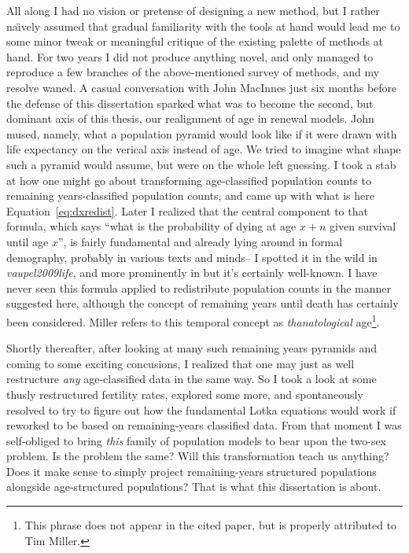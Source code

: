 All along I had no vision or pretense of designing a new method, but I rather
na\"{\i}vely assumed that gradual familiarity with the tools at hand would lead
me to some minor tweak or meaningful critique of the existing palette of methods at
hand. For two years I did not produce anything novel, and only managed to
reproduce a few branches of the above-mentioned survey of methods, and my
resolve waned. A casual conversation with John MacInnes just six months before
the defense of this dissertation sparked what was to become the second, but
dominant axis of this thesis, our realignment of age in renewal models. John
mused, namely, what a population pyramid would look like if it were drawn with
life expectancy on the verical axis instead of age. We tried to imagine what
shape such a pyramid would assume, but were on the whole left guessing. I took a
stab at how one might go about transforming age-classified population counts to
remaining years-classified population counts, and came up with what is here
Equation~\ref{eq:dxredist}. Later I realized that the central component to that
formula, which says ``what is the probability of dying at age $x+n$ given
survival until age $x$'', is fairly fundamental and already lying around in
formal demography, probably in various texts and minds-- I spotted it in the
wild in \textit{vaupel2009life}, and more prominently in
\citet{miller2001increasing} but it's certainly well-known. I have never seen 
this formula applied to redistribute population counts in the manner
suggested here, although the concept of remaining years until death has
certainly been considered. Miller refers to this
temporal concept as \textit{thanatological} age\footnote{This phrase does not
appear in the cited paper, but is properly attributed to Tim Miller.}.

Shortly thereafter, after looking at many such remaining years pyramids and
coming to some exciting concusions, I realized that one may just as well
restructure \textit{any} age-classified data in the same way. So I took a 
look at some thusly restructured fertility rates, explored
some more, and spontaneously resolved to try to figure out how the fundamental
Lotka equations would work if reworked to be based on remaining-years classified
data. From that moment I was self-obliged to bring \textit{this} family of
population models to bear upon the two-sex problem. Is the problem the same?
Will this transformation teach us anything? Does it make sense to simply
project remaining-years structured populations alongside age-structured
populations? That is what this dissertation is about.

